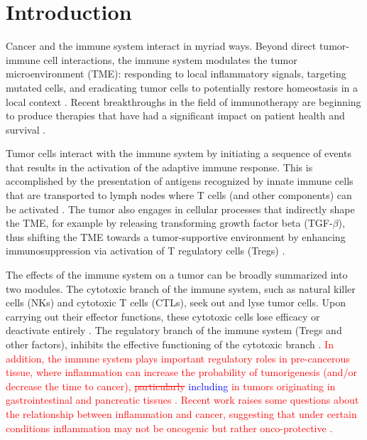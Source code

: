 \documentclass[11pt]{article}
\newcommand{\tcr} { \textcolor{red} }
\newcommand{\tcb} { \textcolor{blue} }
\begin{document}
\section{Introduction}
Cancer and the immune system interact in myriad ways. Beyond direct tumor-immune cell interactions, the immune system modulates the tumor microenvironment (TME): responding to local inflammatory signals, targeting mutated cells, and eradicating tumor cells to potentially restore homeostasis in a local context \cite{de2006paradoxical}. Recent breakthroughs in the field of immunotherapy are beginning to produce therapies that have had a significant impact on patient health and survival \cite{pardoll2012blockade,restifo2012adoptive}.
\par 
Tumor cells interact with the immune system by initiating a sequence of events that results in the activation of the adaptive immune response. This is accomplished by the presentation of antigens recognized by innate immune cells that are transported to lymph nodes where T cells (and other components) can be activated \cite{schreiber11_cancer}. The tumor also engages in cellular processes that indirectly shape the TME, for example by releasing transforming growth factor beta (TGF-$\beta$), thus shifting the TME towards a tumor-supportive environment by enhancing immunosuppression via activation of T regulatory cells (Tregs) \cite{schreiber11_cancer}.
\par
The effects of the immune system on a tumor can be broadly summarized into two modules. The cytotoxic branch of the immune system, such as natural killer cells (NKs) and cytotoxic T cells (CTLs), seek out and lyse tumor cells.
Upon carrying out their effector functions, these cytotoxic cells lose efficacy or deactivate entirely \cite{finn12_immunooncology-1}.
The regulatory branch of the immune system (Tregs and other factors), inhibits the effective functioning of the cytotoxic branch \cite{ruffell2010lymphocytes}.
\tcr{In addition, the immune system plays important regulatory roles in pre-cancerous tissue, where inflammation can increase the probability of tumorigenesis (and/or decrease the time to cancer), \sout{particularly} \tcb{including} in tumors originating in gastrointestinal and pancreatic tissues \cite{hu10_inflammationinduced, balkwill01_inflammation}.}
\tcr{Recent work raises some questions about the relationship between inflammation and cancer, suggesting that under certain conditions inflammation may not be oncogenic but rather onco-protective \cite{guo17_multiscale}.}
\end{document}
